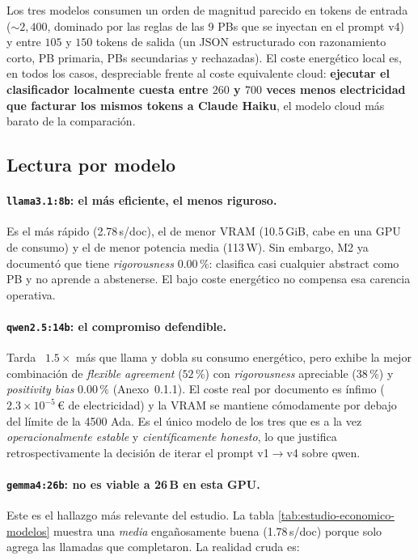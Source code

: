 Los tres modelos consumen un orden de magnitud parecido en tokens de
entrada ($\sim 2{,}400$, dominado por las reglas de las 9 PBs que se
inyectan en el prompt v4) y entre $105$ y $150$ tokens de salida (un JSON
estructurado con razonamiento corto, PB primaria, PBs secundarias y
rechazadas). El coste energético local es, en todos los casos, despreciable
frente al coste equivalente cloud: \textbf{ejecutar el clasificador
localmente cuesta entre $260$ y $700$ veces menos electricidad que
facturar los mismos tokens a Claude Haiku}, el modelo cloud más barato
de la comparación.

\subsection{Lectura por modelo}

\paragraph{\texttt{llama3.1:8b}: el más eficiente, el menos riguroso.}
Es el más rápido (2.78\,s/doc), el de menor VRAM (10.5\,GiB, cabe en una
GPU de consumo) y el de menor potencia media (113\,W). Sin embargo, M2
ya documentó que tiene \emph{rigorousness} $0.00\,\%$: clasifica casi
cualquier abstract como PB y no aprende a abstenerse. El bajo coste
energético no compensa esa carencia operativa.

\paragraph{\texttt{qwen2.5:14b}: el compromiso defendible.}
Tarda ~$1.5\times$ más que llama y dobla su consumo energético, pero
exhibe la mejor combinación de \emph{flexible agreement} ($52\,\%$) con
\emph{rigorousness} apreciable ($38\,\%$) y \emph{positivity bias} $0.00\,\%$
(Anexo~0.1.1). El coste real por documento es ínfimo ($2.3\!\times\!10^{-5}$\,€
de electricidad) y la VRAM se mantiene cómodamente por debajo del límite
de la 4500 Ada. Es el único modelo de los tres que es a la vez
\emph{operacionalmente estable} y \emph{científicamente honesto}, lo que
justifica retrospectivamente la decisión de iterar el prompt v1$\to$v4
sobre qwen.

\paragraph{\texttt{gemma4:26b}: no es viable a 26\,B en esta GPU.}
Este es el hallazgo más relevante del estudio. La tabla
\ref{tab:estudio-economico-modelos} muestra una \emph{media}
engañosamente buena (1.78\,s/doc) porque solo agrega las llamadas que
completaron. La realidad cruda es:

